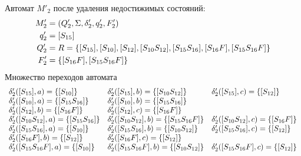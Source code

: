 Автомат \(M'_2\) после удаления недостижимых состояний:
\begin{align*}
	M'_2 & = (Q'_2, \Sigma, \delta'_2, q'_2, F'_2)                                                             \\
	q'_2 & = [S_{15}]                                                                                          \\
	Q'_2 & = R = \left\{[S_{15}],[S_{10}], [S_{12}], [S_{10}S_{12}], [S_{15}S_{16}], [S_{16}F], [S_{15}S_{16}F]\right\} \\
	F'_2 & = \left\{[S_{16}F], [S_{15}S_{16}F]\right\}
\end{align*}
Множество переходов автомата
\begin{align*}
	\begin{array}{lll}
		\delta'_2([S_{15}], a) = \left\{[S_{10}]\right\}             & \delta'_2([S_{15}], b) = \left\{[S_{10}S_{12}]\right\}        & \delta'_2([S_{15}], c) = \left\{[S_{12}]\right\}        \\
		\delta'_2([S_{10}], a) = \left\{[S_{15}S_{16}]\right\}       & \delta'_2([S_{10}], b) = \left\{[S_{15}S_{16}]\right\}                                                         \\
		\delta'_2([S_{12}], b) = \left\{[S_{16}F]\right\}            & \delta'_2([S_{12}], c) = \left\{[S_{16}F]\right\}                                                              \\
		\delta'_2([S_{10}S_{12}], a) = \left\{[S_{15}S_{16}]\right\} & \delta'_2([S_{10}S_{12}], b) = \left\{[S_{15}S_{16}F]\right\} & \delta'_2([S_{10}S_{12}], c) = \left\{[S_{16}F]\right\} \\
		\delta'_2([S_{15}S_{16}], a) = \left\{[S_{10}]\right\}       & \delta'_2([S_{15}S_{16}], b) = \left\{[S_{10}S_{12}]\right\}  & \delta'_2([S_{15}S_{16}], c) = \left\{[S_{12}]\right\}  \\
		\delta'_2([S_{16}F], b) = \left\{[S_{12}]\right\}            & \delta'_2([S_{16}F], c) = \left\{[S_{12}]\right\}                                                              \\
		\delta'_2([S_{15}S_{16}F], a) = \left\{[S_{10}]\right\}      & \delta'_2([S_{15}S_{16}F], b) = \left\{[S_{10}S_{12}]\right\} & \delta'_2([S_{15}S_{16}F], c) = \left\{[S_{12}]\right\} \\
	\end{array}
\end{align*}
